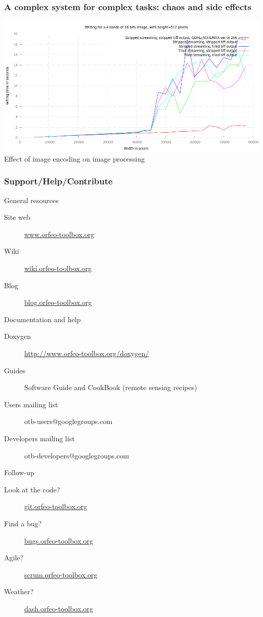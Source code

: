 \documentclass[8pt]{beamer}
\begin{document}
\begin{frame}
\frametitle{A complex system for complex tasks: chaos and side effects}
\begin{center}
\includegraphics[width=\textwidth]{images/Writing.png}\\
\tiny{Effect of image encoding on image processing}
\end{center}
\end{frame}

\begin{frame}
\frametitle{Support/Help/Contribute}
\vspace{-0.2cm}
\begin{block}{General resources}
\vspace{-0.2cm}
\begin{description}
\item[Site web] \url{www.orfeo-toolbox.org}
\item[Wiki] \url{wiki.orfeo-toolbox.org}
\item[Blog] \url{blog.orfeo-toolbox.org}
\end{description}
\end{block}
\vspace{-0.2cm}
\begin{block}{Documentation and help}
\vspace{-0.2cm}
\begin{description}
\item[Doxygen] \url{http://www.orfeo-toolbox.org/doxygen/}
\item[Guides] Software Guide and CookBook (remote sensing recipes)
\item[Users mailing list] otb-users@googlegroups.com
\item[Developers mailing list] otb-developers@googlegroups.com
\end{description}
\end{block}
\vspace{-0.2cm}
\begin{block}{Follow-up}
\vspace{-0.2cm}
\begin{description}
\item[Look at the code?] \url{git.orfeo-toolbox.org}
\item[Find a bug?] \url{bugs.orfeo-toolbox.org}
\item[Agile?] \url{scrum.orfeo-toolbox.org}
\item[Weather?] \url{dash.orfeo-toolbox.org}
\end{description}
\end{block}
\end{frame}
\end{document}
